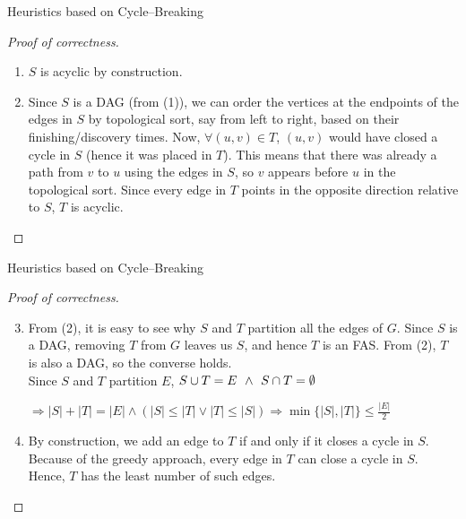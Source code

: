 \documentclass{beamer}
\begin{document}
\begin{frame}{Heuristics based on Cycle–Breaking}
    
    
    \begin{proof}[Proof of correctness]
        
        \begin{enumerate}
            
            \item $S$ is acyclic by construction.

            \item Since $S$ is a DAG (from (1)), we can order the vertices at the endpoints of the edges in $S$ by topological sort, say from left to right, based on their finishing/discovery times. Now, $\forall (u,v) \in T$, $(u,v)$ would have closed a cycle in $S$ (hence it was placed in $T$). This means that there was already a path from $v$ to $u$ using the edges in $S$, so $v$ appears before $u$ in the topological sort. Since every edge in $T$ points in the opposite direction relative to $S$, $T$ is acyclic.

        \end{enumerate}

    \end{proof}


\end{frame}


\begin{frame}{Heuristics based on Cycle–Breaking}
    
    
    \begin{proof}[Proof of correctness]
        
        \begin{enumerate}
        \setcounter{enumi}{2}
            
            \item From (2), it is easy to see why $S$ and $T$ partition all the edges of $G$. Since $S$ is a DAG, removing $T$ from $G$ leaves us $S$, and hence $T$ is an FAS. From (2), $T$ is also a DAG, so the converse holds. \\

            Since $S$ and $T$ partition $E$, $S \cup T = E \hspace{0.4em} \land \hspace{0.4em} S \cap T = \emptyset$

            $\Rightarrow |S| + |T| = |E| \land (|S| \leq |T| \lor |T| \leq |S|) \Rightarrow \min\{|S|, |T|\} \leq \frac{|E|}{2}$

            \item By construction, we add an edge to $T$ if and only if it closes a cycle in $S$. Because of the greedy approach, every edge in $T$ can close a cycle in $S$. Hence, $T$ has the least number of such edges.

        \end{enumerate}

    \end{proof}

\end{frame}
\end{document}
